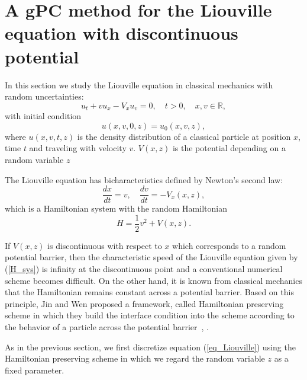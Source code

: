 \documentclass[12pt]{article}
\theoremstyle{plain}
\theoremstyle{remark}
\theoremstyle{remark}
\theoremstyle{remark}
\numberwithin{equation}{section}
\newcommand{\R}{{\mathbb{R}}}
\begin{document}
\section{A gPC method for the Liouville equation with discontinuous potential}
In this section we study the Liouville equation in classical mechanics with random uncertainties:
\begin{equation}\label{eq_Liouville}
  u_t + v  u_x - V_x  u_v = 0, \quad t>0, \quad x, v \in \R,
\end{equation}
with initial condition 
\begin{equation}
  u(x, v, 0, z) = u_0(x, v, z),
\end{equation}
where $u(x, v, t, z)$ is the density distribution of a classical particle at position $x$, time $t$ and traveling with velocity $v$. $V(x, z)$ is the potential depending on a random variable $z$

The Liouville equation has bicharacteristics defined  by Newton's second law:
\begin{equation}\label{H_sys}
    \frac{dx}{dt}=v, \quad \frac{dv}{dt} = -V_x(x, z),
\end{equation}
which is a Hamiltonian system with the random Hamiltonian
\begin{equation}
    H = \frac{1}{2} v^2 + V(x,z).
\end{equation}


If $V(x, z)$ is discontinuous with respect to $x$ which corresponds to a random potential barrier, then the characteristic speed of the Liouville equation given by (\ref{H_sys}) is infinity at the discontinuous point and a conventional numerical scheme becomes difficult. On the other hand, it is known from classical mechanics that the Hamiltonian remains constant across a potential barrier. Based on this principle, Jin and Wen proposed a framework, called Hamiltonian preserving scheme in which they build the interface condition into the scheme according to the behavior of a particle across the potential barrier~\cite{Wen:2005ueba}, \cite{Novak:2006cpba}.

As in the previous section, we first discretize equation (\ref{eq_Liouville}) using the Hamiltonian preserving scheme in which we regard the random variable $z$ as a fixed parameter.
\end{document}
